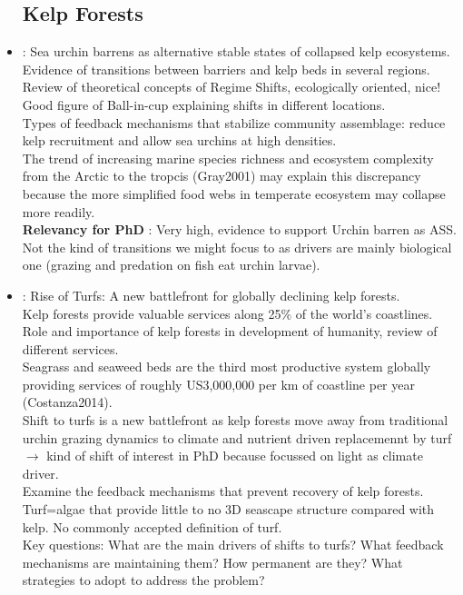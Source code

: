 \documentclass[]{report}
\begin{document}
\begin{itemize}
		\subsection{Kelp Forests}
		\item \cite{filbee2014sea} : Sea urchin barrens as alternative stable states of collapsed kelp ecosystems.
		\\ Evidence of transitions between barriers and kelp beds in several regions.
		\\Review of theoretical concepts of Regime Shifts, ecologically oriented, nice!
		\\Good figure of Ball-in-cup explaining shifts in different locations.
		\\Types of feedback mechanisms that stabilize community assemblage: reduce kelp recruitment and allow sea urchins at high densities.
		\\The trend of increasing marine species richness and ecosystem complexity from the Arctic to the tropcis (Gray2001) may explain this discrepancy because the more simplified food webs in temperate ecosystem may collapse more readily.
		\\\textbf{Relevancy for PhD} : Very high, evidence to support Urchin barren as ASS. Not the kind of transitions we might focus to as drivers are mainly biological one (grazing and predation on fish eat urchin larvae).	
		\item \cite{filbee2018rise} : Rise of Turfs: A new battlefront for globally declining kelp forests.
		\\Kelp forests provide valuable services along 25$\%$ of the world's coastlines.
		\\ Role and importance of kelp forests in development of humanity, review of different services.
		\\ Seagrass and seaweed beds are the third most productive system globally providing services of roughly US3,000,000 per km of coastline per year (Costanza2014).
		\\Shift to turfs is a new battlefront as kelp forests move away from traditional urchin grazing dynamics to climate and nutrient driven replacemennt by turf $\rightarrow$ kind of shift of interest in PhD because focussed on light as climate driver.
		\\Examine the feedback mechanisms that prevent recovery of kelp forests.
		\\Turf=algae that provide little to no 3D seascape structure compared with kelp. No commonly accepted definition of turf.
		\\Key questions: What are the main drivers of shifts to turfs? What feedback mechanisms are maintaining them? How permanent are they? What strategies to adopt to address the problem?

\end{itemize}
\end{document}

